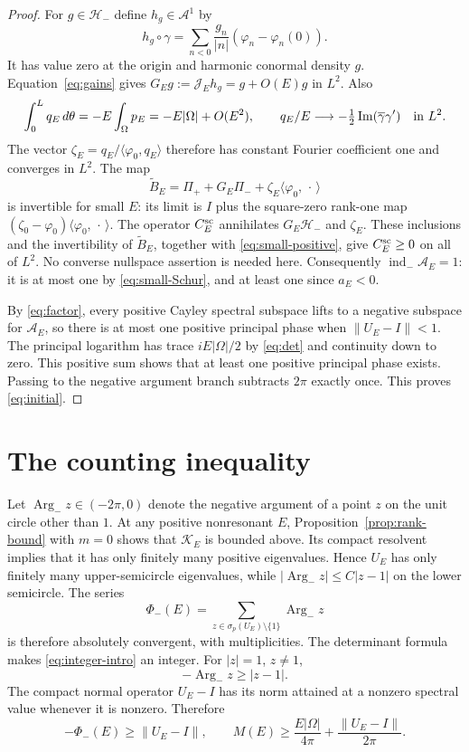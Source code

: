\documentclass[11pt]{amsart}
\numberwithin{equation}{section}
\newcommand{\KK}{\mathcal K}
\newcommand{\Aop}{\mathcal A}
\newcommand{\JJ}{\mathcal J}
\newcommand{\indm}{\operatorname{ind}_{-}}
\newcommand{\ip}[2]{\langle #1,#2\rangle}
\newcommand{\norm}[1]{\lVert #1\rVert}
\newcommand{\Argm}{\operatorname{Arg}_{-}}
\newcommand{\ph}{\varphi}
\begin{document}
\begin{proof}
For $g\in\mathcal H_-$ define $h_g\in\mathscr A^1$ by
\[
 h_g\circ\gamma=\sum_{n<0}\frac{g_n}{|n|}
                         (\ph_n-\ph_n(0)).
\]
It has value zero at the origin and harmonic conormal density $g$.
Equation~\eqref{eq:gains} gives $G_Eg:=\JJ_Eh_g=g+O(E)g$ in $L^2$.
Also
\[
 \int_0^L q_E\,d\theta=-E\int_\Omega p_E
                         =-E|\Omega|+O(E^2),\qquad
 q_E/E\longrightarrow-\tfrac12\operatorname{Im}(\overline\gamma\gamma')
                         \quad\hbox{in }L^2.
\]
The vector $\zeta_E=q_E/\ip{\ph_0}{q_E}$ therefore has constant Fourier
coefficient one and converges in $L^2$. The map
\[
 \widetilde B_E=\Pi_++G_E\Pi_-+\zeta_E\ip{\ph_0}{\,\cdot\,}
\]
is invertible for small $E$: its limit is $I$ plus the square-zero
rank-one map $(\zeta_0-\ph_0)\ip{\ph_0}{\,\cdot\,}$.
The operator $C_E^{\rm sc}$ annihilates $G_E\mathcal H_-$ and
$\zeta_E$. These inclusions and the invertibility of $\widetilde B_E$,
together with \eqref{eq:small-positive}, give $C_E^{\rm sc}\ge0$ on
all of $L^2$. No converse nullspace assertion is needed here.
Consequently $\indm\Aop_E=1$: it is at most one by \eqref{eq:small-Schur},
and at least one since $a_E<0$.

By \eqref{eq:factor}, every positive Cayley spectral subspace lifts to
a negative subspace for $\Aop_E$, so there is at most one positive
principal phase when $\norm{U_E-I}<1$. The principal logarithm has trace
$iE|\Omega|/2$ by \eqref{eq:det} and continuity down to zero. This positive
sum shows that at least one positive principal phase exists. Passing to
the negative argument branch subtracts $2\pi$ exactly once. This proves
\eqref{eq:initial}.
\end{proof}

\section{The counting inequality}\label{sec:counting}

Let $\Argm z\in(-2\pi,0)$ denote the negative argument of a
point $z$ on the unit circle other than $1$.
At any positive nonresonant $E$, Proposition~\ref{prop:rank-bound} with
$m=0$ shows that $\KK_E$ is bounded above. Its compact resolvent implies
that it has only finitely many positive eigenvalues. Hence $U_E$ has
only finitely many upper-semicircle eigenvalues, while
$|\Argm z|\le C|z-1|$ on the lower semicircle. The series
\[
 \Phi_-(E)=\sum_{z\in\sigma_p(U_E)\setminus\{1\}}\Argm z
\]
is therefore absolutely convergent, with multiplicities. The determinant
formula makes \eqref{eq:integer-intro} an integer. For $|z|=1$, $z\ne1$,
\[
 -\Argm z\ge |z-1|.
\]
The compact normal operator $U_E-I$ has its norm attained at a
nonzero spectral value whenever it is nonzero. Therefore
\begin{equation}\label{eq:phase-remainder}
 -\Phi_-(E)\ge\norm{U_E-I},\qquad
 M(E)\ge\frac{E|\Omega|}{4\pi}+\frac{\norm{U_E-I}}{2\pi}.
\end{equation}
\end{document}
